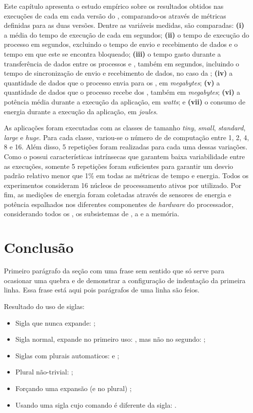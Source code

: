 Este capítulo apresenta o estudo empírico sobre os resultados obtidos nas execuções de cada  em cada versão do \capb, comparando-os através de métricas definidas para as duas versões. Dentre as variáveis medidas, são comparadas: \textbf{(i)} a média do tempo de execução de cada \CC em segundos; \textbf{(ii)} o tempo de execução do processo \master em segundos, excluindo o tempo de envio e recebimento de dados e o tempo em que este se encontra bloqueado; \textbf{(iii)} o tempo gasto durante a transferência de dados entre os processos \master e \slave, também em segundos, incluindo o tempo de sincronização de envio e recebimento de dados, no caso da \IPC; \textbf{(iv)} a quantidade de dados que o processo \master envia para os \slaves, em \textit{megabytes}; \textbf{(v)} a quantidade de dados que o processo \master recebe dos \slaves, também em \textit{megabytes}; \textbf{(vi)} a potência média durante a execução da aplicação, em \textit{watts}; e \textbf{(vii)} o consumo de energia durante a execução da aplicação, em \textit{joules}.

As aplicações foram executadas com as classes de tamanho \textit{tiny}, \textit{small}, \textit{standard}, \textit{large} e \textit{huge}. Para cada classe, variou-se o número de \clusters de computação entre 1, 2, 4, 8 e 16. Além disso, 5 repetições foram realizadas para cada uma dessas variações. Como o \mppa possui características intrínsecas que garantem baixa variabilidade entre as execuções, somente 5 repetições foram suficientes para garantir um desvio padrão relativo menor que 1\% em todas as métricas de tempo e energia. Todos os experimentos consideram 16 núcleos de processamento ativos por \cluster utilizado. Por fim, as medições de energia foram coletadas através de sensores de energia e potência espalhados nos diferentes componentes de \textit{hardware} do processador, considerando todos os \clusters, os subsistemas de \IO, a \NoC e a memória.

\chapter{Conclusão}
\label{ch:conclusao}

 Primeiro parágrafo da seção com uma frase sem sentido que só serve para ocasionar uma quebra e de demonstrar a configuração de indentação da primeira linha. Essa frase está aqui pois parágrafos de uma linha são feios.

Resultado do uso de siglas:
\begin{itemize}
\item Sigla que nunca expande: \API;
\item Sigla normal, expande no primeiro uso: \DHT, mas não no segundo: \DHT;
\item Siglas com plurais automaticos: \APIs e \DHTs;
\item Plural não-trivial: \SQs;
\item Forçando uma expansão (e no plural) ;
\item Usando uma sigla cujo comando é diferente da sigla: \WTC.
\end{itemize}

